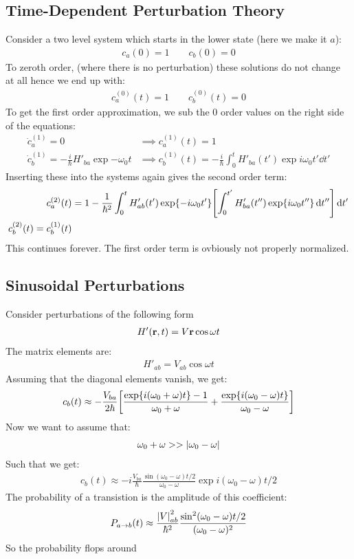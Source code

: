 \subsection{Time-Dependent Perturbation Theory}
Consider a two level system which starts in the lower state (here we make it $a$):
\begin{align*}
  c_a(0)=1\qquad c_b(0)=0
\end{align*}
To zeroth order, (where there is no perturbation) these solutions do not change at all hence we end up with:
\begin{align*}
  c_a^{(0)}(t)=1\qquad c_b^{(0)}(t)=0
\end{align*}
To get the first order approximation, we sub the 0 order values on the right side of the equations:
\begin{align*}
  \dot{c}_a^{(1)}=0&\implies c_a^{(1)}(t)=1\\
  \dot{c}_b^{(1)}=-\frac{i}{\hbar}H'_{ba}\exp{-\omega_0t}&\implies
  c_b^{(1)}(t)=-\frac{i}{\hbar}\int_0^tH'_{ba}(t')\exp{i\omega_0t'}\dd{t'}
\end{align*}
Inserting these into the systems again gives the second order term:
\begin{align*}
  c_a^{(2)}(t)&=1-\frac{1}{\hbar^2}\int_0^tH'_{ab}(t')\exp{-i\omega_0t'}
  \qty[\int_0^{t'}H'_{ba}(t'')\exp{i\omega_0t''}\dd{t''}]\dd{t'}\\
  c_b^{(2)}(t)=c_b^{(1)}(t)
\end{align*}
This continues forever. The first order term is ovbiously not properly normalized.
\subsection{Sinusoidal Perturbations}
Consider perturbations of the following form
\begin{align*}
  H'(\vb{r},t)=V\vb{r}\cos\omega t
\end{align*}
The matrix elements are:
\begin{align*}
  H'_{ab}=V_{ab}\cos\omega t
\end{align*}
Assuming that the diagonal elements vanish, we get:
\begin{align*}
  c_b(t)\approx-\frac{V_{ba}}{2\hbar}\qty
  [\frac{\exp{i(\omega_0+\omega)t}-1}{\omega_0+\omega}+
    \frac{\exp{i(\omega_0-\omega)t}}{\omega_0-\omega}]
\end{align*}
Now we want to assume that:
\begin{align*}
  \omega_0+\omega>>\abs{\omega_0-\omega}
\end{align*}
Such that we get:
\begin{align*}
  c_b(t)\approx-i\frac{V_{ba}}{\hbar}\frac{\sin(\omega_0-\omega)t/2}{\omega_0-\omega}
  \exp{i(\omega_0-\omega)t/2}
\end{align*}
The probability of a transistion is the amplitude of this coefficient:
\begin{align*}
  P_{a\to b}(t)\approx\frac{\abs{V}_{ab}^2}{\hbar^2}\frac{\sin^2(\omega_0-\omega)t/2}
  {(\omega_0-\omega)^2}
\end{align*}
So the probability flops around
